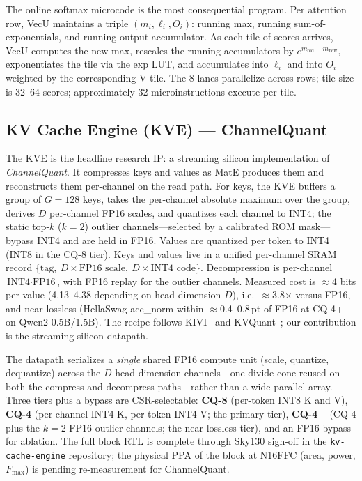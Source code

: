 \documentclass[conference]{IEEEtran}
\begin{document}
The online softmax microcode is the most consequential program. Per attention row, VecU maintains a triple $(m_i, \ell_i, O_i)$: running max, running sum-of-exponentials, and running output accumulator. As each tile of scores arrives, VecU computes the new max, rescales the running accumulators by $e^{m_{\mathrm{old}} - m_{\mathrm{new}}}$, exponentiates the tile via the exp LUT, and accumulates into $\ell_i$ and into $O_i$ weighted by the corresponding V tile. The 8 lanes parallelize across rows; tile size is 32--64 scores; approximately 32 microinstructions execute per tile.

\subsection{KV Cache Engine (KVE) --- ChannelQuant}

The KVE is the headline research IP: a streaming silicon implementation of \emph{ChannelQuant}. It compresses keys and values as MatE produces them and reconstructs them per-channel on the read path. For keys, the KVE buffers a group of $G{=}128$ keys, takes the per-channel absolute maximum over the group, derives $D$ per-channel FP16 scales, and quantizes each channel to INT4; the static top-$k$ ($k{=}2$) outlier channels---selected by a calibrated ROM mask---bypass INT4 and are held in FP16. Values are quantized per token to INT4 (INT8 in the CQ-8 tier). Keys and values live in a unified per-channel SRAM record $\{\text{tag},\ D{\times}\text{FP16 scale},\ D{\times}\text{INT4 code}\}$. Decompression is per-channel $\text{INT4}\cdot\text{FP16}$, with FP16 replay for the outlier channels. Measured cost is $\approx$4 bits per value (4.13--4.38 depending on head dimension $D$), i.e.\ $\approx$3.8$\times$ versus FP16, and near-lossless (HellaSwag acc\_norm within $\approx$0.4--0.8\,pt of FP16 at CQ-4+ on Qwen2-0.5B/1.5B). The recipe follows KIVI~\cite{kivi} and KVQuant~\cite{kvquant}; our contribution is the streaming silicon datapath.

The datapath serializes a \emph{single} shared FP16 compute unit (scale, quantize, dequantize) across the $D$ head-dimension channels---one divide cone reused on both the compress and decompress paths---rather than a wide parallel array. Three tiers plus a bypass are CSR-selectable: \textbf{CQ-8} (per-token INT8 K and V), \textbf{CQ-4} (per-channel INT4 K, per-token INT4 V; the primary tier), \textbf{CQ-4+} (CQ-4 plus the $k{=}2$ FP16 outlier channels; the near-lossless tier), and an FP16 bypass for ablation. The full block RTL is complete through Sky130 sign-off in the \texttt{kv-cache-engine} repository; the physical PPA of the block at N16FFC (area, power, $F_\mathrm{max}$) is pending re-measurement for ChannelQuant.
\end{document}
